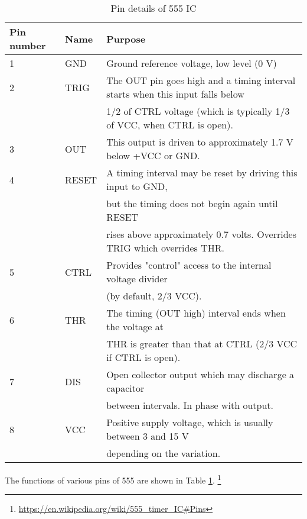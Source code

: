 %
%
%
%
\begin{table}
\caption{Pin details of 555 IC}

\label{555pindetails}

\begin{tabular}{|l|l|l|}


\hline
Pin number& Name& Purpose \\
\hline
1&	GND	& Ground reference voltage, low level (0 V)\\
\hline
2&	TRIG	& The OUT pin goes high and a timing interval starts when this input falls below\\& &  1/2 of  CTRL voltage (which is typically 1/3 of VCC, when CTRL is open).\\
\hline

3&OUT	&This output is driven to approximately 1.7 V below +VCC or GND.\\
\hline

4	& RESET &	A timing interval may be reset by driving this input to GND,\\& &  but the timing does not begin again until RESET\\& &  rises above approximately 0.7 volts. Overrides TRIG which overrides THR.\\
\hline

5&	CTRL&	Provides "control" access to the internal voltage divider \\& & (by default, 2/3 VCC).\\ \hline
6&	THR& 	The timing (OUT high) interval ends when the voltage at \\& & THR is greater than that at CTRL (2/3 VCC if CTRL is open).\\ \hline

7&	DIS&	Open collector output which may discharge a capacitor \\& & between intervals. In phase with output.\\ \hline
 
8&	VCC	& Positive supply voltage, which is usually between 3 and 15 V \\& &  depending on the variation.\\ \hline

 

\end{tabular}
\end{table}
The functions of various pins of 555 are shown in Table \ref{555pindetails}. \footnote{\url{https://en.wikipedia.org/wiki/555_timer_IC\#Pins}}

